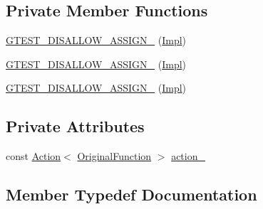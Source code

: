 \subsection*{Private Member Functions}
\begin{DoxyCompactItemize}
\item 
\mbox{\hyperlink{classtesting_1_1internal_1_1_ignore_result_action_1_1_impl_a9e4a21770e75deb8438e6ef633a638f5}{G\+T\+E\+S\+T\+\_\+\+D\+I\+S\+A\+L\+L\+O\+W\+\_\+\+A\+S\+S\+I\+G\+N\+\_\+}} (\mbox{\hyperlink{classtesting_1_1internal_1_1_ignore_result_action_1_1_impl}{Impl}})
\item 
\mbox{\hyperlink{classtesting_1_1internal_1_1_ignore_result_action_1_1_impl_a9e4a21770e75deb8438e6ef633a638f5}{G\+T\+E\+S\+T\+\_\+\+D\+I\+S\+A\+L\+L\+O\+W\+\_\+\+A\+S\+S\+I\+G\+N\+\_\+}} (\mbox{\hyperlink{classtesting_1_1internal_1_1_ignore_result_action_1_1_impl}{Impl}})
\item 
\mbox{\hyperlink{classtesting_1_1internal_1_1_ignore_result_action_1_1_impl_a9e4a21770e75deb8438e6ef633a638f5}{G\+T\+E\+S\+T\+\_\+\+D\+I\+S\+A\+L\+L\+O\+W\+\_\+\+A\+S\+S\+I\+G\+N\+\_\+}} (\mbox{\hyperlink{classtesting_1_1internal_1_1_ignore_result_action_1_1_impl}{Impl}})
\end{DoxyCompactItemize}
\subsection*{Private Attributes}
\begin{DoxyCompactItemize}
\item 
const \mbox{\hyperlink{classtesting_1_1_action}{Action}}$<$ \mbox{\hyperlink{classtesting_1_1internal_1_1_ignore_result_action_1_1_impl_a00db745de37ebae1ee631240098bc2b1}{Original\+Function}} $>$ \mbox{\hyperlink{classtesting_1_1internal_1_1_ignore_result_action_1_1_impl_a7934b7ede40d687b719a65eb8018d182}{action\+\_\+}}
\end{DoxyCompactItemize}


\subsection{Member Typedef Documentation}
\mbox{\label{classtesting_1_1internal_1_1_ignore_result_action_1_1_impl_a1e3be49f0be40b497a57fc462ed3fa23}} 
